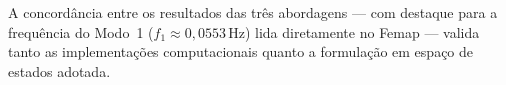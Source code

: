 \documentclass[12pt, a4paper, oneside]{article}
\numberwithin{equation}{section}
\numberwithin{figure}{section}
\numberwithin{table}{section}
\begin{document}

A concordância entre os resultados das três abordagens --- com destaque para a
frequência do Modo~1 ($f_1 \approx 0{,}0553\,\text{Hz}$) lida diretamente no
Femap --- valida tanto as implementações computacionais quanto a formulação em
espaço de estados adotada.










\end{document}
